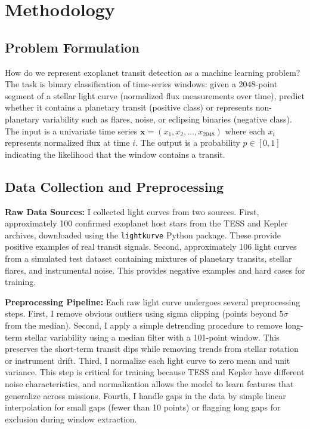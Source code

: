 \documentclass[letterpaper]{article}
\begin{document}
\section{Methodology}

\subsection{Problem Formulation}

How do we represent exoplanet transit detection as a machine learning problem? The task is binary classification of time-series windows: given a 2048-point segment of a stellar light curve (normalized flux measurements over time), predict whether it contains a planetary transit (positive class) or represents non-planetary variability such as flares, noise, or eclipsing binaries (negative class). The input is a univariate time series $\mathbf{x} = (x_1, x_2, \ldots, x_{2048})$ where each $x_i$ represents normalized flux at time $i$. The output is a probability $p \in [0,1]$ indicating the likelihood that the window contains a transit.

\subsection{Data Collection and Preprocessing}

\textbf{Raw Data Sources:} I collected light curves from two sources. First, approximately 100 confirmed exoplanet host stars from the TESS and Kepler archives, downloaded using the \texttt{lightkurve} Python package. These provide positive examples of real transit signals. Second, approximately 106 light curves from a simulated test dataset containing mixtures of planetary transits, stellar flares, and instrumental noise. This provides negative examples and hard cases for training.

\textbf{Preprocessing Pipeline:} Each raw light curve undergoes several preprocessing steps. First, I remove obvious outliers using sigma clipping (points beyond 5$\sigma$ from the median). Second, I apply a simple detrending procedure to remove long-term stellar variability using a median filter with a 101-point window. This preserves the short-term transit dips while removing trends from stellar rotation or instrument drift. Third, I normalize each light curve to zero mean and unit variance. This step is critical for training because TESS and Kepler have different noise characteristics, and normalization allows the model to learn features that generalize across missions. Fourth, I handle gaps in the data by simple linear interpolation for small gaps (fewer than 10 points) or flagging long gaps for exclusion during window extraction.
\end{document}
